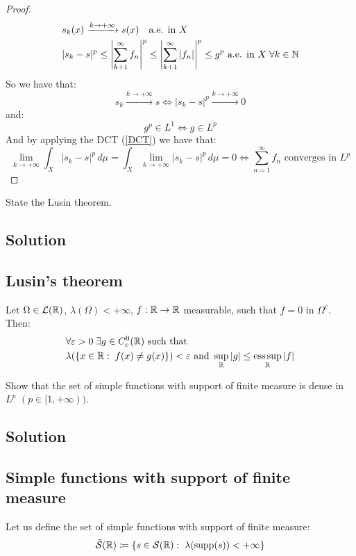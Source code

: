 \begin{proof}
\begin{align*}
        & s_k(x) \xrightarrow{k\to +\infty} s(x) \quad \text{a.e. in } X \\
        & | s_k - s|^p \leq \left| \sum_{k+1}^\infty f_n \right|^p \leq \left| \sum_{k+1}^\infty |f_n| \right|^p \leq g^p \text{ a.e. in } X \; \forall k \in \mathbb{N}
    \end{align*}
    So we have that:
    \[ s_k\xrightarrow{k\to+\infty} s \iff |s_k-s|^p\xrightarrow{k\to+\infty}0 \]
    and:
    \[ g^p \in L^1 \iff g \in L^p \]
    And by applying the DCT (\ref{DCT}) we have that:
    \[ \lim_{k\to+\infty} \int_X |s_k-s|^p \, d\mu = \int_X \lim_{k\to+\infty} |s_k-s|^p    \, d\mu =0 \iff \sum_{n=1}^\infty f_n \text{ converges in } L^p \]
\end{proof}


\question
State the Lusin theorem.

\subsection*{Solution}

\subsection{Lusin's theorem}
Let $\Omega \in \mathcal{L}(\mathbb{R})$, $\lambda(\Omega)<+\infty$, $f:\mathbb{R}\to\mathbb{R}$ measurable, such that $f=0$ in $\Omega^c$. Then:
\begin{align*}
    &\forall \varepsilon >0 \; \exists g \in C^0_c(\mathbb{R}) \text{ such that }\\
    & \lambda(\{ x\in \mathbb{R}: \; f(x)\neq g(x)\}) < \varepsilon \text{ and } \sup_{\mathbb{R}} |g| \leq \operatorname*{ess\,sup}_{\mathbb{R}} |f|
\end{align*} %


\question
Show that the set of simple functions with support of finite measure is dense in $L^p$ $(p \in [1, +\infty))$.

\subsection*{Solution}

\subsection{Simple functions with support of finite measure}
Let us define the set of simple functions with support of finite measure:
\[ \tilde{\mathcal{S}}(\mathbb{R}) \coloneqq \{ s\in\mathcal{S}(\mathbb{R}): \; \lambda(\operatorname{supp}(s))<+\infty \} \]

